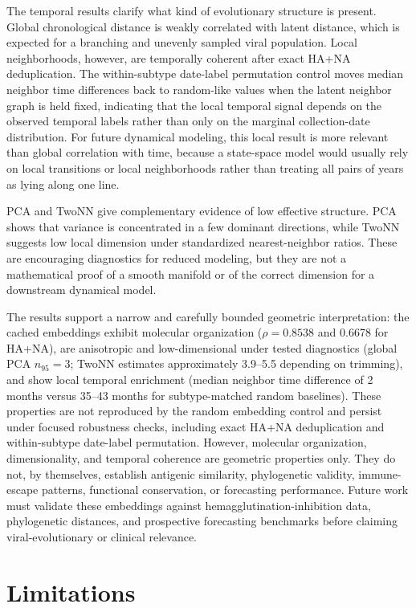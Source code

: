 \documentclass[11pt]{article}
\begin{document}
The temporal results clarify what kind of evolutionary structure is present. Global chronological distance is weakly correlated with latent distance, which is expected for a branching and unevenly sampled viral population. Local neighborhoods, however, are temporally coherent after exact HA+NA deduplication. The within-subtype date-label permutation control moves median neighbor time differences back to random-like values when the latent neighbor graph is held fixed, indicating that the local temporal signal depends on the observed temporal labels rather than only on the marginal collection-date distribution. For future dynamical modeling, this local result is more relevant than global correlation with time, because a state-space model would usually rely on local transitions or local neighborhoods rather than treating all pairs of years as lying along one line.

PCA and TwoNN give complementary evidence of low effective structure. PCA shows that variance is concentrated in a few dominant directions, while TwoNN suggests low local dimension under standardized nearest-neighbor ratios. These are encouraging diagnostics for reduced modeling, but they are not a mathematical proof of a smooth manifold or of the correct dimension for a downstream dynamical model.

The results support a narrow and carefully bounded geometric interpretation: the cached embeddings exhibit molecular organization ($\rho=0.8538$ and 0.6678 for HA+NA), are anisotropic and low-dimensional under tested diagnostics (global PCA $n_{95}=3$; TwoNN estimates approximately 3.9--5.5 depending on trimming), and show local temporal enrichment (median neighbor time difference of 2 months versus 35--43 months for subtype-matched random baselines). These properties are not reproduced by the random embedding control and persist under focused robustness checks, including exact HA+NA deduplication and within-subtype date-label permutation. However, molecular organization, dimensionality, and temporal coherence are geometric properties only. They do not, by themselves, establish antigenic similarity, phylogenetic validity, immune-escape patterns, functional conservation, or forecasting performance. Future work must validate these embeddings against hemagglutination-inhibition data, phylogenetic distances, and prospective forecasting benchmarks before claiming viral-evolutionary or clinical relevance.

\section{Limitations}
\end{document}
